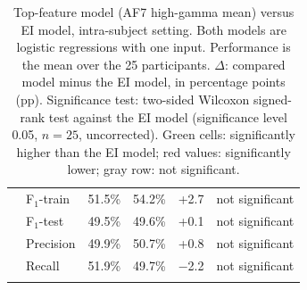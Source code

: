 \begin{table}[H]
\begin{tabularx}{\textwidth}{c l >{\centering\arraybackslash}p{2.5cm} >{\centering\arraybackslash}X >{\centering\arraybackslash}p{1.5cm}|>{\centering\arraybackslash}p{2.95cm}}
\arrayrulecolor{black}\hline
\cellcolor{classBox} & \textcolor{nsGray}{F\(_1\)-train} & \textcolor{nsGray}{51.5\%} & \textcolor{nsGray}{54.2\%} & \textcolor{nsGray}{+2.7} & {\footnotesize\textcolor{nsGray}{not significant}} \\
\arrayrulecolor{ruleGray}\cline{2-6}
\cellcolor{classBox} & \textcolor{nsGray}{F\(_1\)-test} & \textcolor{nsGray}{49.5\%} & \textcolor{nsGray}{49.6\%} & \textcolor{nsGray}{+0.1} & {\footnotesize\textcolor{nsGray}{not significant}} \\
\arrayrulecolor{ruleGray}\cline{2-6}
\cellcolor{classBox} & \textcolor{nsGray}{Precision} & \textcolor{nsGray}{49.9\%} & \textcolor{nsGray}{50.7\%} & \textcolor{nsGray}{+0.8} & {\footnotesize\textcolor{nsGray}{not significant}} \\
\arrayrulecolor{ruleGray}\cline{2-6}
\cellcolor{classBox}\multirow{-4}{*}{\rotatebox[origin=c]{90}{\texttt{SKIP}}} & \textcolor{nsGray}{Recall} & \textcolor{nsGray}{51.9\%} & \textcolor{nsGray}{49.7\%} & \textcolor{nsGray}{\(-\)2.2} & {\footnotesize\textcolor{nsGray}{not significant}} \\
\arrayrulecolor{black}\hline
\end{tabularx}
\caption{Top-feature model (AF7 high-gamma mean) versus EI model, intra-subject setting. Both models are logistic regressions with one input. Performance is the mean over the 25 participants. \(\Delta\): compared model minus the EI model, in percentage points (pp). Significance test: two-sided Wilcoxon signed-rank test against the EI model (significance level 0.05, $n=25$, uncorrected). Green cells: significantly higher than the EI model; red values: significantly lower; gray row: not significant.}
\label{tab:metrics_5_intra_1}
\end{table}
